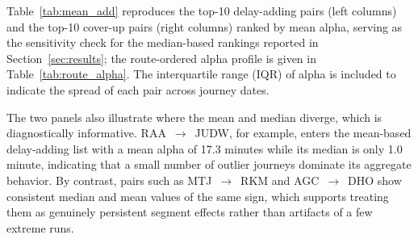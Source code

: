 \documentclass[a4paper,fleqn]{cas-dc}
\begin{document}
Table~\ref{tab:mean_add} reproduces the top-10 delay-adding pairs (left columns)
and the top-10 cover-up pairs (right columns) ranked by mean alpha, serving as
the sensitivity check for the median-based rankings reported in
Section~\ref{sec:results}; the route-ordered alpha profile is given in
Table~\ref{tab:route_alpha}. The interquartile range (IQR) of alpha is included
to indicate the spread of each pair across journey dates.

The two panels also illustrate where the mean and median diverge, which is
diagnostically informative. RAA~$\rightarrow$~JUDW, for example, enters the
mean-based delay-adding list with a mean alpha of 17.3 minutes while its
median is only 1.0 minute, indicating that a small number of outlier journeys
dominate its aggregate behavior. By contrast, pairs such as
MTJ~$\rightarrow$~RKM and AGC~$\rightarrow$~DHO show consistent median and mean
values of the same sign, which supports treating them as genuinely persistent
segment effects rather than artifacts of a few extreme runs.
\end{document}
